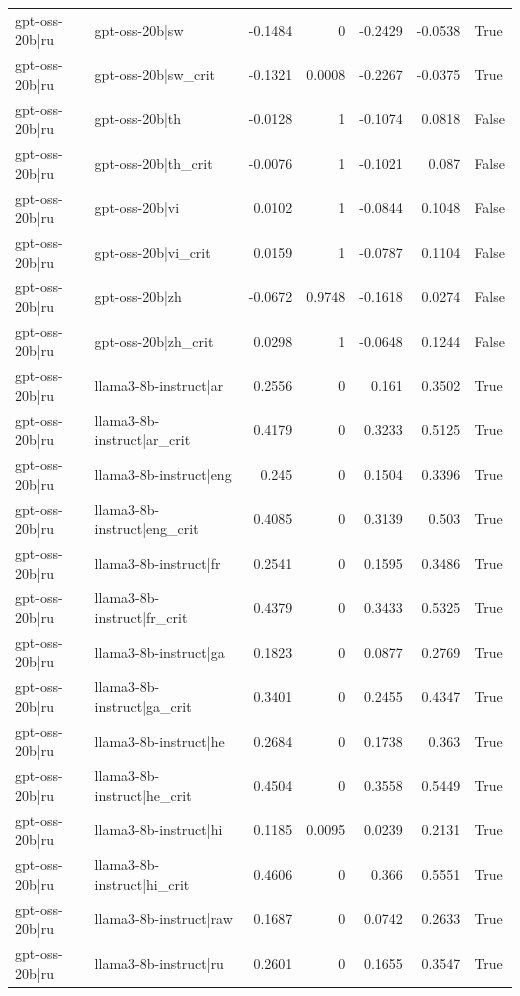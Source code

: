 \begin{table}
\begin{tabular}{l l r r r r l}
gpt-oss-20b|ru & gpt-oss-20b|sw & -0.1484 & 0 & -0.2429 & -0.0538 & True \\
gpt-oss-20b|ru & gpt-oss-20b|sw_crit & -0.1321 & 0.0008 & -0.2267 & -0.0375 & True \\
gpt-oss-20b|ru & gpt-oss-20b|th & -0.0128 & 1 & -0.1074 & 0.0818 & False \\
gpt-oss-20b|ru & gpt-oss-20b|th_crit & -0.0076 & 1 & -0.1021 & 0.087 & False \\
gpt-oss-20b|ru & gpt-oss-20b|vi & 0.0102 & 1 & -0.0844 & 0.1048 & False \\
gpt-oss-20b|ru & gpt-oss-20b|vi_crit & 0.0159 & 1 & -0.0787 & 0.1104 & False \\
gpt-oss-20b|ru & gpt-oss-20b|zh & -0.0672 & 0.9748 & -0.1618 & 0.0274 & False \\
gpt-oss-20b|ru & gpt-oss-20b|zh_crit & 0.0298 & 1 & -0.0648 & 0.1244 & False \\
gpt-oss-20b|ru & llama3-8b-instruct|ar & 0.2556 & 0 & 0.161 & 0.3502 & True \\
gpt-oss-20b|ru & llama3-8b-instruct|ar_crit & 0.4179 & 0 & 0.3233 & 0.5125 & True \\
gpt-oss-20b|ru & llama3-8b-instruct|eng & 0.245 & 0 & 0.1504 & 0.3396 & True \\
gpt-oss-20b|ru & llama3-8b-instruct|eng_crit & 0.4085 & 0 & 0.3139 & 0.503 & True \\
gpt-oss-20b|ru & llama3-8b-instruct|fr & 0.2541 & 0 & 0.1595 & 0.3486 & True \\
gpt-oss-20b|ru & llama3-8b-instruct|fr_crit & 0.4379 & 0 & 0.3433 & 0.5325 & True \\
gpt-oss-20b|ru & llama3-8b-instruct|ga & 0.1823 & 0 & 0.0877 & 0.2769 & True \\
gpt-oss-20b|ru & llama3-8b-instruct|ga_crit & 0.3401 & 0 & 0.2455 & 0.4347 & True \\
gpt-oss-20b|ru & llama3-8b-instruct|he & 0.2684 & 0 & 0.1738 & 0.363 & True \\
gpt-oss-20b|ru & llama3-8b-instruct|he_crit & 0.4504 & 0 & 0.3558 & 0.5449 & True \\
gpt-oss-20b|ru & llama3-8b-instruct|hi & 0.1185 & 0.0095 & 0.0239 & 0.2131 & True \\
gpt-oss-20b|ru & llama3-8b-instruct|hi_crit & 0.4606 & 0 & 0.366 & 0.5551 & True \\
gpt-oss-20b|ru & llama3-8b-instruct|raw & 0.1687 & 0 & 0.0742 & 0.2633 & True \\
gpt-oss-20b|ru & llama3-8b-instruct|ru & 0.2601 & 0 & 0.1655 & 0.3547 & True \\

\end{tabular}
\end{table}

